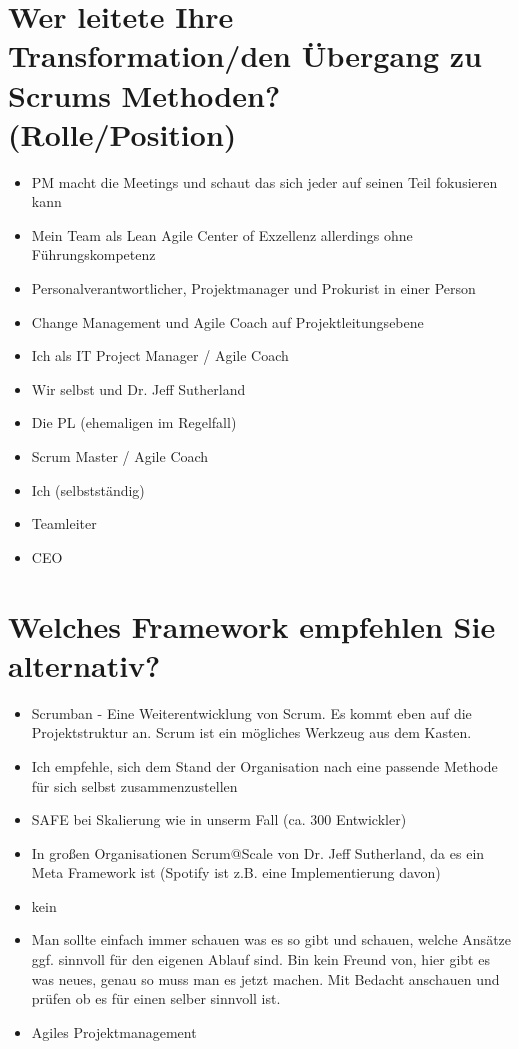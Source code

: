 \section*{Wer leitete Ihre Transformation/den Übergang zu Scrums Methoden? (Rolle/Position)}
\begin{itemize}
    \item[\openresponse] PM macht die Meetings und schaut das sich jeder auf seinen Teil fokusieren kann
    \item[\openresponse] Mein Team als Lean Agile Center of Exzellenz allerdings ohne Führungskompetenz
    \item[\openresponse] Personalverantwortlicher, Projektmanager und Prokurist in einer Person
    \item[\openresponse] Change Management und Agile Coach auf Projektleitungsebene
    \item[\openresponse] Ich als IT Project Manager / Agile Coach
    \item[\openresponse] Wir selbst und Dr. Jeff Sutherland
    \item[\openresponse] Die PL (ehemaligen im Regelfall)
    \item[\openresponse] Scrum Master / Agile Coach
    \item[\openresponse] Ich (selbstständig)
    \item[\openresponse] Teamleiter
    \item[\openresponse] CEO
\end{itemize}

\section*{Welches Framework empfehlen Sie alternativ?}
\begin{itemize}
    \item[\openresponse] Scrumban - Eine Weiterentwicklung von Scrum. Es kommt eben auf die Projektstruktur an. Scrum ist ein mögliches Werkzeug aus dem Kasten.
    \item[\openresponse] Ich empfehle, sich dem Stand der Organisation nach eine passende Methode für sich selbst zusammenzustellen
    \item[\openresponse] SAFE bei Skalierung wie in unserm Fall (ca. 300 Entwickler)
    \item[\openresponse] In großen Organisationen Scrum@Scale von Dr. Jeff Sutherland, da es ein Meta Framework ist (Spotify ist z.B. eine Implementierung davon)
    \item[\openresponse] kein
    \item[\openresponse] Man sollte einfach immer schauen was es so gibt und schauen, welche Ansätze ggf. sinnvoll für den eigenen Ablauf sind. Bin kein Freund von, hier gibt es was neues, genau so muss man es jetzt machen. Mit Bedacht anschauen und prüfen ob es für einen selber sinnvoll ist.
    \item[\openresponse] Agiles Projektmanagement
\end{itemize}

